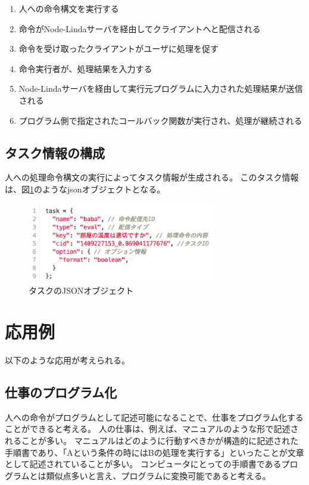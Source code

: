\documentclass[twoside]{wiss}
\begin{document}
\begin{enumerate}
  \item 人への命令構文を実行する
  \item 命令がNode-Lindaサーバを経由してクライアントへと配信される
  \item 命令を受け取ったクライアントがユーザに処理を促す
  \item 命令実行者が、処理結果を入力する
  \item Node-Lindaサーバを経由して実行元プログラムに入力された処理結果が送信される
  \item プログラム側で指定されたコールバック関数が実行され、処理が継続される
\end{enumerate}

\subsection{タスク情報の構成}

人への処理命令構文の実行によってタスク情報が生成される。
このタスク情報は、図\ref{task}のようなjsonオブジェクトとなる。

\begin{figure}[!h]
  \includegraphics[width=83mm, bb=0 0 755 318]{./images/task.png}
  \caption{タスクのJSONオブジェクト}  
  \label{task}
\end{figure}

\section{応用例}

以下のような応用が考えられる。

\subsection{仕事のプログラム化}

人への命令がプログラムとして記述可能になることで、仕事をプログラム化することができると考える。
人の仕事は、例えば、マニュアルのような形で記述されることが多い。
マニュアルはどのように行動すべきかが構造的に記述された手順書であり、「Aという条件の時にはBの処理を実行する」といったことが文章として記述されていることが多い。
コンピュータにとっての手順書であるプログラムとは類似点多いと言え、プログラムに変換可能であると考える。
\end{document}
